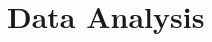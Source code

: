 \documentclass[
 size=14pt,
 paper=smartboard,  %
 mode=present, 		%
 display=slides, 	%
 style=tuliplab,  	%
 pauseslide,
 fleqn,leqno]{powerdot}
\begin{document}




\section{Data Analysis}
\end{document}
